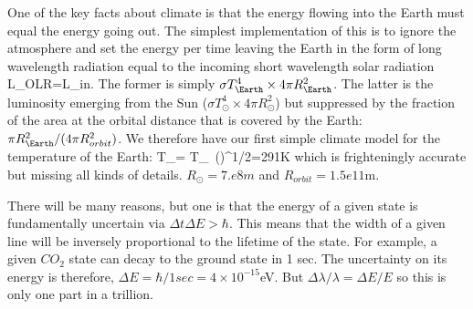 \documentclass[11pt]{book}
\begin{document}
\item One of the key facts about climate is that the energy flowing into the Earth must equal the energy going out. The simplest implementation of this is to ignore the atmosphere and set the energy per time leaving the Earth in the form of long wavelength radiation equal to the incoming short wavelength solar radiation
\be
L_{OLR}=L_{in}.
\ee
The former is simply $\sigma T_\Earth^4 \times 4\pi R_\Earth^2$. The latter is the luminosity emerging from the Sun ($\sigma T_\odot^4 \times 4\pi R_\odot^2$) but suppressed by the fraction of the area at the orbital distance that is covered by the Earth: $\pi R_\Earth^2/(4\pi R_{orbit}^2)$. We therefore have our first simple climate model for the temperature of the Earth:
\be
T_\Earth = T_\odot \, \left(\right)^{1/2}=291K\ee
which is frighteningly accurate but missing all kinds of details. $R_\odot=7.e8m$ and
$R_{orbit}=1.5e11$m.
\eee


 There will be many reasons, but one is that the energy of a given state is fundamentally uncertain via $\Delta t\Delta E >\hbar$. This means that the width of a given line will be inversely proportional to the lifetime of the state. For example, a given $CO_2$ state can decay to the ground state in 1 sec. The uncertainty on its energy is therefore, $\Delta E = \hbar/1sec = 4\times 10^{-15}$eV. But $\Delta\lambda/\lambda = \Delta E/E$ so this is only one part in a trillion.


\end{document}
